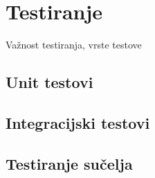 \chapter{Testiranje}

\TODO Važnost testiranja, vrste testove

\section{Unit testovi}

\section{Integracijski testovi}

\section{Testiranje sučelja}
